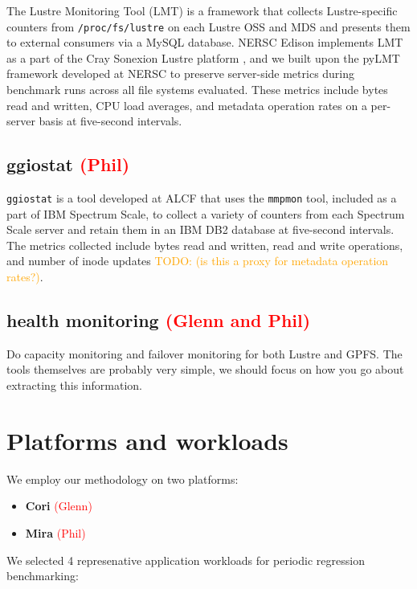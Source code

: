 \documentclass[conference,10pt,compsocconf]{IEEEtran}
\newcommand{\assign}[1]{\textcolor{red}{(#1)}}
\newcommand{\todo}[1]{\textcolor{Orange}{TODO: #1}}
\begin{document}
The Lustre Monitoring Tool (LMT) is a framework that collects Lustre-specific
counters from \texttt{/proc/fs/lustre} on each Lustre OSS and MDS and presents
them to external consumers via a MySQL database.  NERSC Edison implements LMT
as a part of the Cray Sonexion Lustre platform \cite{Keopp2014}, and we built
upon the pyLMT framework developed at NERSC \cite{Uselton2009} to preserve
server-side metrics during benchmark runs across all file systems evaluated.
These metrics include bytes read and written, CPU load averages, and metadata
operation rates on a per-server basis at five-second intervals.

\subsection{ggiostat \assign{Phil}}

\texttt{ggiostat} is a tool developed at ALCF that uses the \texttt{mmpmon}
tool, included as a part of IBM Spectrum Scale, to collect a variety of counters
from each Spectrum Scale server and retain them in an IBM DB2 database at
five-second intervals.  The metrics collected include bytes read and written,
read and write operations, and number of inode updates \todo{(is this
a proxy for metadata operation rates?)}.

\subsection{health monitoring \assign{Glenn and Phil}}

Do capacity monitoring and failover monitoring for both Lustre and GPFS.  The
tools themselves are probably very simple, we should focus on how you go
about extracting this information.

\section{Platforms and workloads} \label{platforms}

We employ our methodology on two platforms:

\begin{itemize}
\item \textbf{Cori} \assign{Glenn}
\item \textbf{Mira} \assign{Phil}
\end{itemize}

We selected 4 represenative application workloads for periodic regression
benchmarking:
\end{document}
